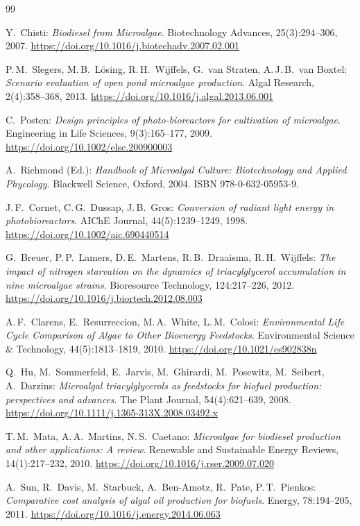 ﻿\documentclass[a4paper,12pt]{article}
\theoremstyle{definition}
\begin{document}
\begin{thebibliography}{99}

Y.~Chisti:
\textit{Biodiesel from Microalgae}.
Biotechnology Advances, 25(3):294--306, 2007.
\url{https://doi.org/10.1016/j.biotechadv.2007.02.001}

P.\,M.~Slegers, M.\,B.~Lösing, R.\,H.~Wijffels, G.~van Straten, A.\,J.\,B.~van Boxtel:
\textit{Scenario evaluation of open pond microalgae production}.
Algal Research, 2(4):358--368, 2013.
\url{https://doi.org/10.1016/j.algal.2013.06.001}

C.~Posten:
\textit{Design principles of photo-bioreactors for cultivation of microalgae}.
Engineering in Life Sciences, 9(3):165--177, 2009.
\url{https://doi.org/10.1002/elsc.200900003}

A.~Richmond (Ed.):
\textit{Handbook of Microalgal Culture: Biotechnology and Applied Phycology}.
Blackwell Science, Oxford, 2004.
ISBN 978-0-632-05953-9.

J.\,F.~Cornet, C.\,G.~Dussap, J.\,B.~Gros:
\textit{Conversion of radiant light energy in photobioreactors}.
AIChE Journal, 44(5):1239--1249, 1998.
\url{https://doi.org/10.1002/aic.690440514}

G.~Breuer, P.\,P.~Lamers, D.\,E.~Martens, R.\,B.~Draaisma, R.\,H.~Wijffels:
\textit{The impact of nitrogen starvation on the dynamics of triacylglycerol
accumulation in nine microalgae strains}.
Bioresource Technology, 124:217--226, 2012.
\url{https://doi.org/10.1016/j.biortech.2012.08.003}

A.\,F.~Clarens, E.~Resurreccion, M.\,A.~White, L.\,M.~Colosi:
\textit{Environmental Life Cycle Comparison of Algae to Other Bioenergy Feedstocks}.
Environmental Science \& Technology, 44(5):1813--1819, 2010.
\url{https://doi.org/10.1021/es902838n}

Q.~Hu, M.~Sommerfeld, E.~Jarvis, M.~Ghirardi, M.~Posewitz, M.~Seibert, A.~Darzins:
\textit{Microalgal triacylglycerols as feedstocks for biofuel production:
perspectives and advances}.
The Plant Journal, 54(4):621--639, 2008.
\url{https://doi.org/10.1111/j.1365-313X.2008.03492.x}

T.\,M.~Mata, A.\,A.~Martins, N.\,S.~Caetano:
\textit{Microalgae for biodiesel production and other applications: A review}.
Renewable and Sustainable Energy Reviews, 14(1):217--232, 2010.
\url{https://doi.org/10.1016/j.rser.2009.07.020}

A.~Sun, R.~Davis, M.~Starbuck, A.~Ben-Amotz, R.~Pate, P.\,T.~Pienkos:
\textit{Comparative cost analysis of algal oil production for biofuels}.
Energy, 78:194--205, 2011.
\url{https://doi.org/10.1016/j.energy.2014.06.063}

\end{thebibliography}
\end{document}
